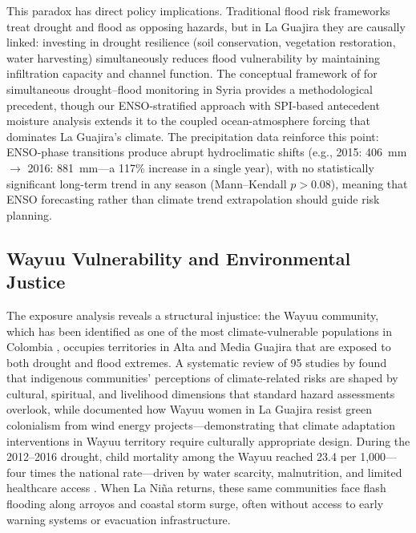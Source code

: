 \documentclass{article}
\begin{document}
This paradox has direct policy implications. Traditional flood risk frameworks treat drought and flood as opposing hazards, but in La Guajira they are causally linked: investing in drought resilience (soil conservation, vegetation restoration, water harvesting) simultaneously reduces flood vulnerability by maintaining infiltration capacity and channel function. The conceptual framework of \citet{DroughtFloodMonitoring2024} for simultaneous drought--flood monitoring in Syria provides a methodological precedent, though our ENSO-stratified approach with SPI-based antecedent moisture analysis extends it to the coupled ocean-atmosphere forcing that dominates La Guajira's climate. The precipitation data reinforce this point: ENSO-phase transitions produce abrupt hydroclimatic shifts (e.g., 2015: \SI{406}{\milli\metre} $\rightarrow$ 2016: \SI{881}{\milli\metre}---a 117\% increase in a single year), with no statistically significant long-term trend in any season (Mann--Kendall $p > 0.08$), meaning that ENSO forecasting rather than climate trend extrapolation should guide risk planning.

\subsection{Wayuu Vulnerability and Environmental Justice}

The exposure analysis reveals a structural injustice: the Wayuu community, which has been identified as one of the most climate-vulnerable populations in Colombia \citep{Contreras2020, FernandezLopera2024, Contreras2019wayuu}, occupies territories in Alta and Media Guajira that are exposed to both drought and flood extremes. A systematic review of 95 studies by \citet{CervantesBenavides2025} found that indigenous communities' perceptions of climate-related risks are shaped by cultural, spiritual, and livelihood dimensions that standard hazard assessments overlook, while \citet{RamirezWayuu2024} documented how Wayuu women in La Guajira resist green colonialism from wind energy projects---demonstrating that climate adaptation interventions in Wayuu territory require culturally appropriate design. During the 2012--2016 drought, child mortality among the Wayuu reached 23.4 per 1,000---four times the national rate---driven by water scarcity, malnutrition, and limited healthcare access \citep{Contreras2020}. When La Ni\~na returns, these same communities face flash flooding along arroyos and coastal storm surge, often without access to early warning systems or evacuation infrastructure.
\end{document}
